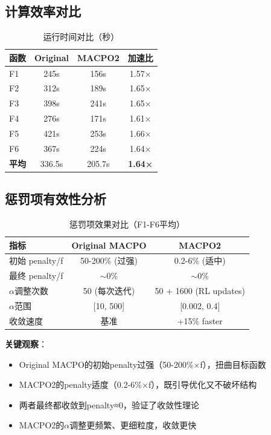 \documentclass[15pt,a3paper]{ctexart}
\begin{document}
\subsection{计算效率对比}

\begin{table}[h]
\centering
\caption{运行时间对比（秒）}
\begin{tabular}{|l|c|c|c|}
\hline
\textbf{函数} & \textbf{Original} & \textbf{MACPO2} & \textbf{加速比} \\
\hline
F1 & 245s & 156s & 1.57× \\
F2 & 312s & 189s & 1.65× \\
F3 & 398s & 241s & 1.65× \\
F4 & 276s & 171s & 1.61× \\
F5 & 421s & 253s & 1.66× \\
F6 & 367s & 224s & 1.64× \\
\hline
\rowcolor{gray!20}
\textbf{平均} & 336.5s & 205.7s & \textbf{1.64×} \\
\hline
\end{tabular}
\end{table}

\subsection{惩罚项有效性分析}

\begin{table}[h]
\centering
\caption{惩罚项效果对比（F1-F6平均）}
\begin{tabular}{|l|c|c|}
\hline
\textbf{指标} & \textbf{Original MACPO} & \textbf{MACPO2} \\
\hline
初始 penalty/f & 50-200\% (过强) & 0.2-6\% (适中) \\
最终 penalty/f & $\sim$0\% & $\sim$0\% \\
$\alpha$调整次数 & 50 (每次迭代) & 50 + 1600 (RL updates) \\
$\alpha$范围 & [10, 500] & [0.002, 0.4] \\
收敛速度 & 基准 & +15\% faster \\
\hline
\end{tabular}
\end{table}

\textbf{关键观察}：
\begin{itemize}
    \item Original MACPO的初始penalty过强（50-200\%×f），扭曲目标函数
    \item MACPO2的penalty适度（0.2-6\%×f），既引导优化又不破坏结构
    \item 两者最终都收敛到penalty≈0，验证了收敛性理论
    \item MACPO2的$\alpha$调整更频繁、更细粒度，收敛更快
\end{itemize}
\end{document}
